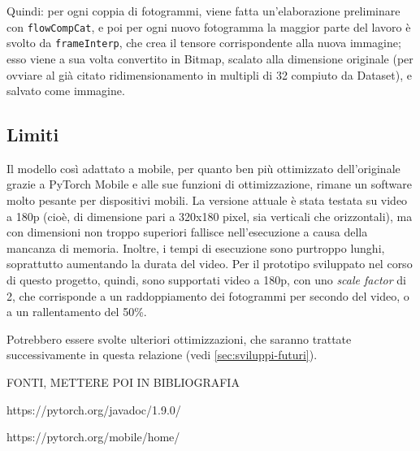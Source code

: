 Quindi: per ogni coppia di fotogrammi, viene fatta un'elaborazione preliminare con
\texttt{flowCompCat}, e poi per ogni nuovo fotogramma la maggior parte del lavoro è svolto da
\texttt{frameInterp}, che crea il tensore corrispondente alla nuova immagine; esso viene a sua
volta convertito in Bitmap, scalato alla dimensione originale (per ovviare al già 
citato ridimensionamento in multipli di 32 compiuto da Dataset), e salvato come immagine.

\subsection{Limiti}

Il modello così adattato a mobile, per quanto ben più ottimizzato dell'originale grazie a
PyTorch Mobile e alle sue funzioni di ottimizzazione, rimane un software molto pesante per
dispositivi mobili. La versione attuale è stata testata su video a 180p (cioè, di dimensione
pari a 320x180 pixel, sia verticali che orizzontali), ma con dimensioni non troppo superiori
fallisce nell'esecuzione a causa della mancanza di memoria. Inoltre, i tempi di esecuzione
sono purtroppo lunghi, soprattutto aumentando la durata del video. Per il prototipo sviluppato 
nel corso di questo progetto, quindi, sono supportati video a 180p, con uno \emph{scale factor} 
di 2, che corrisponde a un raddoppiamento dei fotogrammi per secondo del video, o a un
rallentamento del 50\%.

Potrebbero essere svolte ulteriori ottimizzazioni, che saranno trattate successivamente 
in questa relazione (vedi \ref{sec:sviluppi-futuri}).

FONTI, METTERE POI IN BIBLIOGRAFIA

https://pytorch.org/javadoc/1.9.0/

https://pytorch.org/mobile/home/
